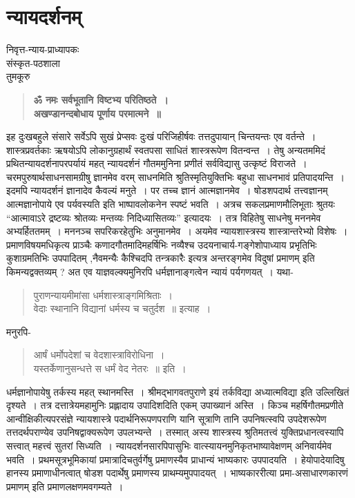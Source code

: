 {\fontsize{15}{17}\selectfont
\chapter{न्यायदर्शनम्}

\begin{center}
\smallskip
निवृत्त-न्याय-प्राध्यापकः\\
संस्कृत-पठशाला\\
तुमकूरु
\addrule
\end{center}
\begin{verse}
\textbf{ॐ नमः सर्वभूतानि विष्टभ्य परितिष्ठते~। \\
अखण्डानन्दबोधाय पूर्णाय परमात्मने~॥}
\end{verse}

इह दुःखबहुले संसारे सर्वेऽपि सुखं प्रेप्सवः दुःखं परिजिहीर्षवः तत्तदुपायान् चिन्तयन्तः एव वर्तन्ते~। शास्त्रप्रवर्तकाः ऋषयोऽपि लोकानुग्रहार्थं स्वतपसा साधितं शास्त्ररूपेण वितन्वन्त~। तेषु अन्यतममिदं प्रथितन्यायदर्शनापरपर्यायं महत् न्यायदर्शनं गौतममुनिना प्रणीतं सर्वविद्यासु उत्कृष्टं विराजते~। चरमपुरुषार्थसाधनसामग्रीषु ज्ञानमेव वरम् साधनमिति श्रुतिस्मृतियुक्तिभिः बहुधा साधनभावं प्रतिपादयन्ति~। इदमपि न्यायदर्शनं ज्ञानादेव कैवल्यं मनुते~। पर तच्च ज्ञानं आत्मज्ञानमेव~। षोडशपदार्थ तत्त्वज्ञानम् आत्मज्ञानोपाये एव पर्यवस्यति इति भाष्पावलोकनेन स्पष्टं भवति~। अत्रच सकलप्रमाणमौलिभूताः श्रुतयः “आत्मावाऽरे द्रष्टव्यः श्रोतव्यः मन्तव्यः निदिध्यासितव्यः” इत्यादयः~। तत्र विहितेषु साधनेषु मननमेव अभ्यर्हिततमम्~। मननञ्च सपरिकरहेतुभिः अनुमानमेव~। अयमेव न्यायशास्त्रस्य शास्त्रान्तरेभ्यो विशेषः~। प्रमाणविषयमधिकृत्य प्राञ्चैः कणादगौतमादिमहर्षिभिः नव्यैश्च उदयनाचार्य-गङ्गेशोपाध्याय प्रभृतिभिः कुशाग्रमतिभिः उपपादितम् ,नैवमन्यैः कैश्चिदपि तन्त्रकारैः इत्यत्र अन्तरङ्गमेव विदुषां प्रमाणम् इति किमन्यद्वक्तव्यम् ?  अत एव याज्ञवल्क्यमुनिरपि धर्मज्ञानाङ्गत्वेन न्यायं पर्यगणयत्~। यथा- 
\begin{verse}
पुराणन्यायमीमांसा धर्मशास्त्राङ्गमिश्रिताः~। \\
वेदाः स्थानानि विद्यानां धर्मस्य च चतुर्दश~॥ इत्याह~। 
\end{verse}    

मनुरपि-

\begin{verse}
आर्षं धर्मोपदेशां च वेदशास्त्राविरोधिना~। \\
यस्तर्केणानुसन्धत्ते स धर्मं वेद नेतरः~॥ इति~। 
\end{verse}

धर्मज्ञानोपायेषु तर्कस्य महत् स्थानमस्ति~। श्रीमद्भागवतपुराणे इयं तर्कविद्या अध्यात्मविद्या इति उल्लिखितं दृश्यते~। तत्र दत्तात्रेयमहामुनिः प्रह्लादाय उपादिशदिति एकम् उपाख्यानं अस्ति~। किञ्च महर्षिगौतमप्रणीते आन्वीक्षिकीत्यपरसंज्ञे न्यायशास्त्रे पदार्थनिरूपणपराणि यानि सूत्राणि तानि उपनिषत्स्वपि उपदेशरूपेण तत्तदर्थपराण्येव उपनिषद्वाक्यरूपेण उपलभ्यन्ते~। तस्मात् अस्य शास्त्रस्य श्रुतिमतत्त्वं युक्तिप्रधानत्वस्यापि सत्त्वात् महत्त्वं सुतरां सिध्यति~।                      न्यायदर्शनसारपिपासुभिः वात्स्यायनमुनिकृतभाष्यावेक्षणम् अनिवार्यमेव भवति~। प्रथमसूत्रभूमिकायां प्रमात्रादिचतुर्वर्गेषु प्रमाणस्यैव प्राधान्यं भाष्यकारः उपपादयति~। हेयोपादेयादिषु हानस्य प्रमाणाधीनत्वात् षोडश पदार्थेषु प्रमाणस्य प्राथम्यमुपपादयत्~। भाष्यकाररीत्या प्रमा-असाधारणकारणं प्रमाणम् इति प्रमाणलक्षणमवगम्यते~। 

}
